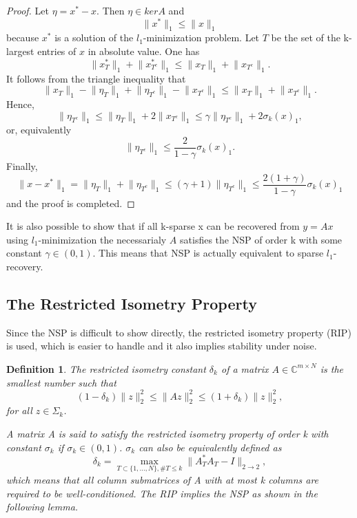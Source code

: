 \documentclass[
  english,        %
  font=times,     %
  onecolumn,      %
]{tumarticle}
\newtheorem{definition}{Definition}[section]
\numberwithin{equation}{section} %
\begin{document}
\begin{large}
\begin{adjustwidth}{0pt}{0pt}
\begin{proof}
Let $\eta = x^* - x$. Then $\eta \in ker A$ and
\[ \lVert x^* \rVert_1 \leq \lVert x \rVert_1 \]
because $x^*$ is a solution of the $l_1$-minimization problem. Let $T$ be the set of the k-largest entries of $x$ in absolute value. One has
\[ \lVert x^*_T \rVert_1 + \lVert x^*_{T^c} \rVert_1 \leq \lVert x_T \rVert_1 + \lVert x_{T^c} \rVert_1 .\]
It follows from the triangle inequality that
\[ \lVert x_{T} \rVert_1 - \lVert \eta_{T} \rVert_1 + \lVert \eta_{T^c} \rVert_1 - \lVert x_{T^c} \rVert_1 \leq \lVert x_{T} \rVert_1 + \lVert x_{T^c} \rVert_1 .\]
Hence,
\[ \lVert \eta_{T^c} \rVert_1 \leq \lVert \eta_{T} \rVert_1 + 2 \lVert x_{T^c} \rVert_1 \leq \gamma \lVert \eta_{T^c} \rVert_1 + 2 \sigma_k (x)_1 ,\]
or, equivalently
\[ \lVert \eta_{T^c} \rVert_1 \leq \frac{2}{1-\gamma} \sigma_k (x)_1 .\]
Finally,
\[ \lVert x - x^* \rVert_1 = \lVert \eta_{T} \rVert_1 + \lVert \eta_{T^c} \rVert_1 \leq (\gamma + 1) \lVert \eta_{T^c} \rVert_1 \leq \frac{2 (1 + \gamma)}{1-\gamma} \sigma_k (x)_1\]
and the proof is completed.
\end{proof}

It is also possible to show that if all k-sparse x can be recovered from $y = Ax$ using $l_1$-minimization the necessarialy $A$ satisfies the NSP of order k with some constant $\gamma \in (0,1)$. This means that NSP is actually equivalent to sparse $l_1$-recovery.

\subsection{The Restricted Isometry Property}
Since the NSP is difficult to show directly, the restricted isometry property (RIP) is used, which is easier to handle and it also implies stability under noise.

\begin{definition}
The restricted isometry constant $\delta_k$ of a matrix $A \in \mathbb{C}^{m \times N}$ is the smallest number such that
\[ (1 - \delta_k) \lVert z \rVert^2_2 \leq \lVert Az \rVert^2_2 \leq (1 + \delta_k) \lVert z \rVert^2_2 ,\]
for all $z \in \Sigma_k$.

A matrix A is said to satisfy the restricted isometry property of order k with constant $\sigma_k$ if $\sigma_k \in (0,1)$. $\sigma_k$ can also be equivalently defined as
\[ \delta_k = \max_{T \subset \{1,...,N\}, \#T \leq k} \lVert A_T^* A_T - I \rVert_{2 \rightarrow 2} ,\]
which means that all column submatrices of A with at most k columns are required to be well-conditioned. The RIP implies the NSP as shown in the following lemma.
\end{definition}


\end{adjustwidth}
\end{large}
\end{document}
